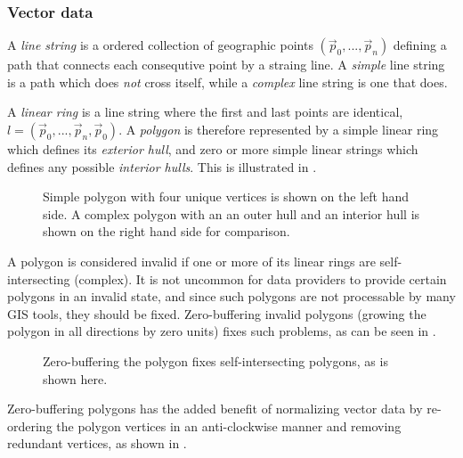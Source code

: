 \subsubsection{Vector data}

A \textit{line string} is a ordered collection of geographic points $(\vec{p}_0, ..., \vec{p}_n)$ defining a path that connects each consequtive point by a straing line.
A \textit{simple} line string is a path which does \textit{not} cross itself, while a \textit{complex} line string is one that does.

A \textit{linear ring} is a line string where the first and last points are identical, $l = (\vec{p}_0, ..., \vec{p}_n, \vec{p}_0)$.
A \textit{polygon} is therefore represented by a simple linear ring which defines its \textit{exterior hull}, and zero or more simple linear strings which defines any possible \textit{interior hulls}.
This is illustrated in .

\begin{figure}[htb]
  \centering
  
  \textcolor{gray}{\vrule}
  \hspace{0.01\linewidth}
  
  \caption{
    Simple polygon with four unique vertices is shown on the left hand side.
    A complex polygon with an an outer hull
    and an interior hull is shown on the right hand side for comparison.
  }
  \label{fig:polygon-representation}
\end{figure}

A polygon is considered invalid if one or more of its linear rings are self-intersecting (complex).
It is not uncommon for data providers to provide certain polygons in an invalid state, and since such polygons are not processable by many GIS tools, they should be fixed.
Zero-buffering invalid polygons (growing the polygon in all directions by zero units) fixes such problems, as can be seen in .

\begin{figure}[H]
  \centering
  
  \caption{Zero-buffering the polygon fixes self-intersecting polygons, as is shown here.}
  \label{fig:complex-zero-buffer}
\end{figure}

Zero-buffering polygons has the added benefit of normalizing vector data by re-ordering the polygon vertices in an anti-clockwise manner and removing redundant vertices, as shown in .

